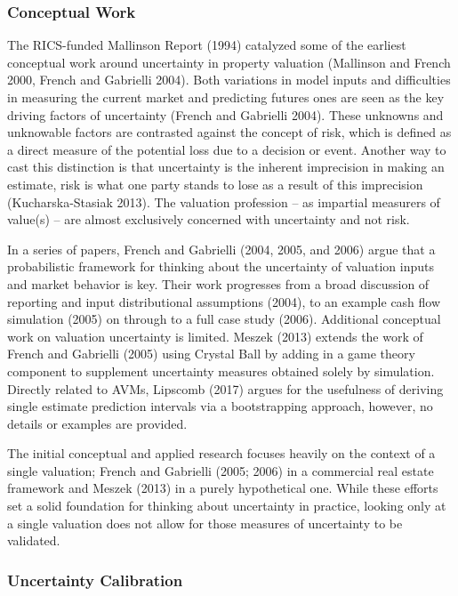 \documentclass[colTwo]{anon}
\theoremstyle{definition}
\begin{document}
\subsubsection{Conceptual Work}

The RICS-funded Mallinson Report (1994) catalyzed some of the earliest conceptual work around uncertainty in property valuation (Mallinson and French 2000, French and Gabrielli 2004). Both variations in model inputs and difficulties in measuring the current market and predicting futures ones are seen as the key driving factors of uncertainty (French and Gabrielli 2004). These unknowns and unknowable factors are contrasted against the concept of risk, which is defined as a direct measure of the potential loss due to a decision or event.  Another way to cast this distinction is that uncertainty is the inherent imprecision in making an estimate, risk is what one party stands to lose as a result of this imprecision (Kucharska-Stasiak 2013).  The valuation profession -- as impartial measurers of value(s) -- are almost exclusively concerned with uncertainty and not risk.

In a series of papers, French and Gabrielli (2004, 2005, and 2006) argue that a probabilistic framework for thinking about the uncertainty of valuation inputs and market behavior is key. Their work progresses from a broad discussion of reporting and input distributional assumptions (2004), to an example cash flow simulation (2005) on through to a full case study (2006). Additional conceptual work on valuation uncertainty is limited.  Meszek (2013) extends the work of French and Gabrielli (2005) using Crystal Ball by adding in a game theory component to supplement uncertainty measures obtained solely by simulation.  Directly related to AVMs, Lipscomb (2017) argues for the usefulness of deriving single estimate prediction intervals via a bootstrapping approach, however, no details or examples are provided. 

The initial conceptual and applied research focuses heavily on the context of a single valuation; French and Gabrielli (2005; 2006) in a commercial real estate framework and Meszek (2013) in a purely hypothetical one. While these efforts set a solid foundation for thinking about uncertainty in practice, looking only at a single valuation does not allow for those measures of uncertainty to be validated. 

\subsubsection{Uncertainty Calibration}
\end{document}
